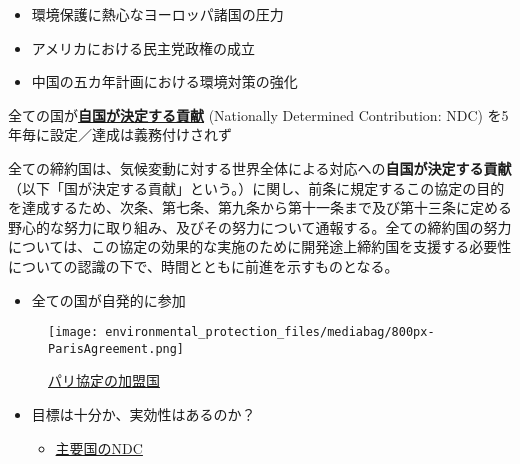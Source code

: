 \documentclass[
  xelatex,
  ja=standard]{bxjsarticle}
\providecommand{\tightlist}{%
  \setlength{\itemsep}{0pt}\setlength{\parskip}{0pt}}\usepackage{longtable,booktabs,array}
\begin{document}
\begin{itemize}
\tightlist
\item
  環境保護に熱心なヨーロッパ諸国の圧力
\item
  アメリカにおける民主党政権の成立
\item
  中国の五カ年計画における環境対策の強化
\end{itemize}

全ての国が\href{https://www4.unfccc.int/sites/NDCStaging/Pages/All.aspx}{\textbf{自国が決定する貢献}}
(Nationally Determined Contribution: NDC)
を5年毎に設定／達成は義務付けされず

\begin{tcolorbox}[enhanced jigsaw, left=2mm, arc=.35mm, breakable, coltitle=black, bottomtitle=1mm, toprule=.15mm, leftrule=.75mm, colbacktitle=quarto-callout-note-color!10!white, colback=white, colframe=quarto-callout-note-color-frame, bottomrule=.15mm, titlerule=0mm, toptitle=1mm, opacitybacktitle=0.6, opacityback=0, rightrule=.15mm, title=\textcolor{quarto-callout-note-color}{\faInfo}\hspace{0.5em}{\href{https://www.env.go.jp/earth/ondanka/cop/shiryo.html}{パリ協定}　第3条}]

全ての締約国は、気候変動に対する世界全体による対応への\textbf{自国が決定する貢献}（以下「国が決定する貢献」という。）に関し、前条に規定するこの協定の目的を達成するため、次条、第七条、第九条から第十一条まで及び第十三条に定める野心的な努力に取り組み、及びその努力について通報する。全ての締約国の努力については、この協定の効果的な実施のために開発途上締約国を支援する必要性についての認識の下で、時間とともに前進を示すものとなる。

\end{tcolorbox}

\begin{itemize}
\tightlist
\item
  全ての国が自発的に参加
\end{itemize}

\begin{figure}[htpb]

{\centering \texttt{[image: environmental\_protection\_files/mediabag/800px-ParisAgreement.png]}

}

\caption{\href{https://commons.wikimedia.org/wiki/File:ParisAgreement.svg}{パリ協定の加盟国}}

\end{figure}

\begin{itemize}
\tightlist
\item
  目標は十分か、実効性はあるのか？

  \begin{itemize}
  \tightlist
  \item
    \href{https://www.mofa.go.jp/mofaj/ic/ch/page1w_000121.html}{主要国のNDC}
  \end{itemize}
\end{itemize}
\end{document}
